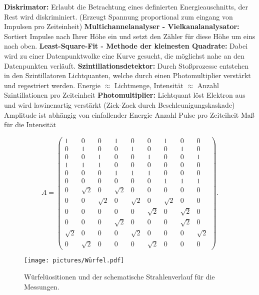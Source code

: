 \textbf{Diskrimator:} Erlaubt die Betrachtung eines definierten Energieauschnitts, der Rest wird diskriminiert. (Erzeugt Spannung proportional zum eingang von Impulsen pro Zeiteinheit)
\textbf{Multichannelanalyser - Vielkanalanalysator:} Sortiert Impulse nach Ihrer Höhe ein und setzt den Zähler für diese Höhe um eins nach oben.
\textbf{Least-Square-Fit - Methode der kleinesten Quadrate:} Dabei wird zu einer Datenpunktwolke eine Kurve gesucht, die möglichst nahe an den Datenpunkten verläuft.
\textbf{Szintillationsdetektor:} Durch Stoßprozesse entstehen in den Szintillatoren Lichtquanten, welche durch einen Photomultiplier verstärkt und regestriert werden. Energie $\approx$ Lichtmenge, Intensität $\approx$ Anzahl Szintillationen pro Zeiteinheit 
\textbf{Photomultiplier:} Lichtquant löst Elektron aus und wird lawinenartig verstärkt (Zick-Zack durch Beschleunigungskaskade) Amplitude ist abhängig von einfallender Energie
Anzahl Pulse pro Zeiteiheit Maß für die Intensität

 \begin{equation*}
   A = \begin{pmatrix}
              1 & 0 & 0 & 1 & 0 & 0 & 1 & 0 & 0 \\
              0 & 1 & 0 & 0 & 1 & 0 & 0 & 1 & 0 \\
              0 & 0 & 1 & 0 & 0 & 1 & 0 & 0 & 1 \\
              1 & 1 & 1 & 0 & 0 & 0 & 0 & 0 & 0 \\
              0 & 0 & 0 & 1 & 1 & 1 & 0 & 0 & 0 \\
              0 & 0 & 0 & 0 & 0 & 0 & 1 & 1 & 1 \\
              0 & \sqrt{2} & 0 & \sqrt{2} & 0 & 0 & 0 & 0 & 0 \\
              0 & 0 & \sqrt{2} & 0 & \sqrt{2} & 0 & \sqrt{2} & 0 & 0 \\
              0 & 0 & 0 & 0 & 0 & \sqrt{2} & 0 & \sqrt{2} & 0 \\
              0 & 0 & 0 & \sqrt{2} & 0 & 0 & 0 & \sqrt{2} & 0 \\
              \sqrt{2} & 0 & 0 & 0 & \sqrt{2} & 0 & 0 & 0 & \sqrt{2} \\
              0 & \sqrt{2} & 0 & 0 & 0 & \sqrt{2} & 0 & 0 & 0
      \end{pmatrix}.
      \label{eqn:matrix}
 \end{equation*}

\begin{figure}[htb]
  \centering
  \texttt{[image: pictures/Würfel.pdf]}
  \caption{Würfelüositionen und der schematische Strahlenverlauf für die Messungen.}
  \label{fig:Pos}
\end{figure}